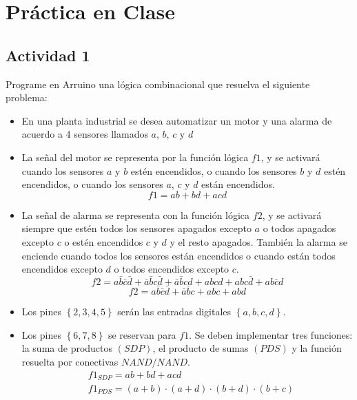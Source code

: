 \section{Práctica en Clase}

\subsection{Actividad 1}

Programe en Arruino una lógica combinacional que resuelva el siguiente problema:
\begin{itemize}
    \item En una planta industrial se desea automatizar un motor y una alarma de acuerdo a 4 sensores llamados $a$, $b$, $c$ y $d$ 
    \item La señal del motor se representa por la función lógica $f1$, y se activará  cuando los sensores $a$ y $b$ estén encendidos, o cuando los sensores $b$ y $d$ estén encendidos, o cuando los sensores $a$, $c$ y $d$ están encendidos.
    \begin{equation*}
        f1 = ab + bd + acd
    \end{equation*}
    \item La señal de  alarma se representa con la función lógica $f2$, y se activará siempre que estén todos los sensores apagados excepto $a$ o todos apagados excepto $c$ o estén encendidos $c$ y $d$ y el resto apagados. También la alarma se enciende cuando todos los sensores están encendidos o cuando están todos encendidos excepto $d$ o todos encendidos excepto $c$.
    \begin{equation*}
        f2 = a\bar{b}\bar{c}\bar{d} + \bar{a}\bar{b}c\bar{d} + \bar{a}\bar{b}cd + abcd + abc\bar{d} + ab\bar{c}d
    \end{equation*}
    \begin{equation*}
        f2 = a\bar{b}\bar{c}\bar{d} + \bar{a}\bar{b}c + abc + abd
    \end{equation*}
    \item Los pines $\left\lbrace 2,3,4,5\right\rbrace$ serán las entradas digitales $\left\lbrace a,b,c,d\right\rbrace$.
    \item Los pines $\left\lbrace 6,7,8\right\rbrace $ se reservan para $f1$. Se deben implementar tres funciones: la suma de productos $(SDP)$, el producto de sumas $(PDS)$ y la función resuelta por conectivas $NAND/NAND$. 
    \begin{align*}
        &f1_{SDP} = ab + bd + acd\\
        &f1_{PDS} = (a+b)\cdot (a+d)\cdot (b+d)\cdot (b+c)\\

\end{align*}
\end{itemize}
